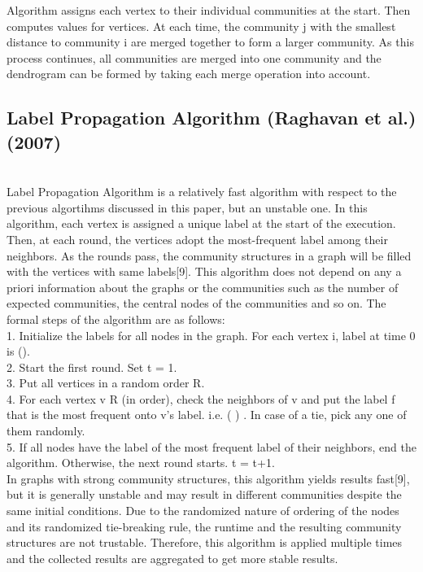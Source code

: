 \documentclass[10pt]{article}
\begin{document}
Algorithm assigns each vertex to their individual communities at the start. Then computes values for vertices. At each time, the community j with the smallest distance to community i are
merged together to form a larger community. As this process continues, all communities are merged into one community and the dendrogram can be formed by taking each merge operation into account. \\

\subsection{Label Propagation Algorithm (Raghavan et al.) (2007)} \\

Label Propagation Algorithm is a relatively fast algorithm with respect to the previous algortihms discussed in this paper, but an unstable one. In this algorithm, each vertex is assigned a unique label at the start of the execution. Then, at each round, the vertices adopt the most-frequent label among their neighbors. As the rounds pass, the community structures in a graph will be filled with the vertices with same labels[9]. This algorithm does not depend on any a priori information about the graphs or the communities such as the number of expected communities, the central nodes of the communities and so on. The formal steps of the algorithm are as follows: \\

1. Initialize the labels for all nodes in the graph. For each vertex i, label at time 0 is (). \\
2. Start the first round. Set t = 1. \\
3. Put all vertices in a random order R. \\
4. For each vertex v R (in order), check the neighbors of v and put the label f that is the most frequent onto v’s label. i.e. ( ) . In case of a tie, pick any one of them
randomly. \\
5. If all nodes have the label of the most frequent label of their neighbors, end the algorithm. Otherwise, the next round starts. t = t+1. \\

In graphs with strong community structures, this algorithm yields results fast[9], but it is generally unstable and may result in different communities despite the same initial conditions. Due
to the randomized nature of ordering of the nodes and its randomized tie-breaking rule, the runtime and the resulting community structures are not trustable. Therefore, this algorithm is applied multiple times and the collected results are aggregated to get more stable results. \\
\end{document}
